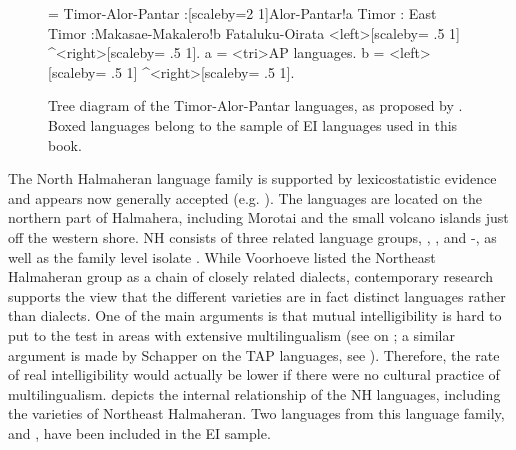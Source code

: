 \begin{figure}

\begin{footnotesize}
\jtree[xunit=5em,yunit=2em]
\! = {Timor-Alor-Pantar}
:[scaleby=2 1]{Alor-Pantar}!a {Timor}
:{} {East Timor}
:{Makasae-Makalero}!b {Fataluku-Oirata}
<left>[scaleby= .5 1]{} ^<right>[scaleby= .5 1]{}.
\!a = <tri>{AP languages}{}.
\!b = <left>[scaleby= .5 1]{} ^<right>[scaleby= .5 1]{}.
\endjtree
\end{footnotesize}

\caption[The Timor-Alor-Pantar languages]{Tree diagram of the Timor-Alor-Pantar languages, as proposed by \citet{schapper2014intro}. Boxed languages belong to the sample of EI languages used in this book.}\label{fig:timor-alor-pantar}
\end{figure}

The North Halmaheran language family is supported by lexicostatistic evidence and appears now generally accepted (e.g. \citealt{Voorhoeve1994, reesink2005west}). The languages are located on the northern part of Halmahera, including Morotai and the small volcano islands just off the western shore. NH consists of three related language groups, , , and -, as well as the family level isolate  \citep{Voorhoeve1994}. While Voor\-hoeve listed the Northeast Halmaheran group as a chain of closely related dialects, contemporary research supports the view that the different varieties are in fact distinct languages rather than dialects. One of the main arguments is that mutual intelligibility is hard to put to the test in areas with extensive multilingualism (see \citealt{holton2003tobelo} on ; a similar argument is made by Schapper on the TAP languages, see \citealt[3]{schapper2014intro}). Therefore, the rate of real intelligibility would actually be lower if there were no cultural practice of multilingualism.  depicts the internal relationship of the NH languages, including the varieties of Northeast Halmaheran. Two languages from this language family,  and , have been included in the EI sample.

